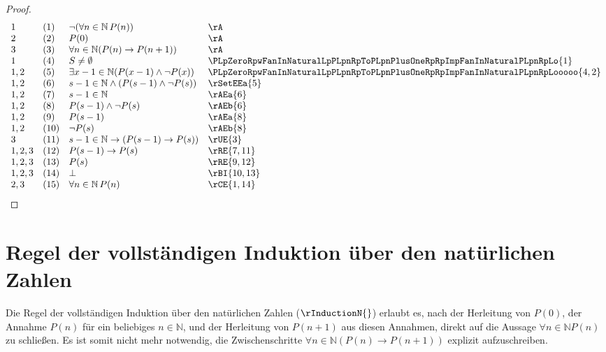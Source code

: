 \documentclass{book}
\theoremstyle{plain}
\theoremstyle{remark}
\theoremstyle{definition}
\begin{document}
\begin{proof}
	\[
	\begin{array}{llll}
		1 &  (1) & \neg (\forall n \in \mathbb{N} \, P(n)) & \rA \\
		2 &  (2) & P(0) & \rA \\			
		3 &  (3) & \forall n \in \mathbb{N}(P(n)\rightarrow P(n+1)) & \rA \\
		1 &  (4) & S\neq\emptyset & \PLpZeroRpwFanInNaturalLpPLpnRpToPLpnPlusOneRpRpImpFanInNaturalPLpnRpLo{1} \\	
            1,2 & (5) & \exists x-1\in\mathbb{N}(P(x-1)\land\neg P(x))& \PLpZeroRpwFanInNaturalLpPLpnRpToPLpnPlusOneRpRpImpFanInNaturalPLpnRpLooooo{4,2}  \\
            1,2 & (6) & s-1\in\mathbb{N}\land (P(s-1)\land\neg P(s))& \rSetEEa{5}  \\
            1,2 & (7) & s-1\in\mathbb{N}& \rAEa{6}  \\
            1,2 & (8) & P(s-1)\land\neg P(s)& \rAEb{6}  \\
            1,2 & (9) & P(s-1)& \rAEa{8}  \\
            1,2 & (10) & \neg P(s)& \rAEb{8}  \\
            3 & (11) & s-1\in\mathbb{N}\rightarrow (P(s-1)\rightarrow P(s))& \rUE{3}  \\
            1,2,3 & (12) & P(s-1)\rightarrow P(s)& \rRE{7,11}  \\
            1,2,3 & (13) & P(s)& \rRE{9,12}  \\
            1,2,3 & (14) & \bot & \rBI{10,13}  \\
            2,3 & (15) & \forall n \in \mathbb{N} \, P(n) & \rCE{1,14}  \\
	\end{array}
	\]
\end{proof}

\section{Regel der vollständigen Induktion über den natürlichen Zahlen}
\label{rule:rInductionN}

Die Regel der vollständigen Induktion über den natürlichen Zahlen (\(\rInductionN{}\)) erlaubt es, nach der Herleitung von \(P(0)\), der Annahme \(P(n)\) für ein beliebiges \(n \in \mathbb{N}\), und der Herleitung von \(P(n+1)\) aus diesen Annahmen, direkt auf die Aussage \(\forall n \in \mathbb{N} P(n)\) zu schließen. Es ist somit nicht mehr notwendig, die Zwischenschritte \(\forall n \in \mathbb{N} (P(n) \rightarrow P(n+1))\) explizit aufzuschreiben.
\end{document}
